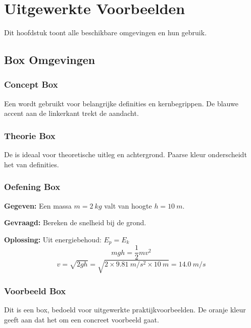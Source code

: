 
\chapter{Uitgewerkte Voorbeelden}
\label{ch:voorbeelden}

Dit hoofdstuk toont alle beschikbare omgevingen en hun gebruik.

\section{Box Omgevingen}

\subsection{Concept Box}
\begin{conceptbox}
Een  wordt gebruikt voor belangrijke definities en kernbegrippen.
De blauwe accent aan de linkerkant trekt de aandacht.
\end{conceptbox}

\subsection{Theorie Box}
\begin{theorieblok}
De  is ideaal voor theoretische uitleg en achtergrond.
Paarse kleur onderscheidt het van definities.
\end{theorieblok}

\subsection{Oefening Box}
\begin{oefenblok}[Oefening 3.1]
\textbf{Gegeven:} Een massa $m = \SI{2}{kg}$ valt van hoogte $h = \SI{10}{m}$.

\textbf{Gevraagd:} Bereken de snelheid bij de grond.

\textbf{Oplossing:}
Uit energiebehoud: $E_p = E_k$
\[ mgh = \frac{1}{2}mv^2 \]
\[ v = \sqrt{2gh} = \sqrt{2 \times \SI{9.81}{m/s^2} \times \SI{10}{m}} = \SI{14.0}{m/s} \]
\end{oefenblok}

\subsection{Voorbeeld Box}
\begin{voorbeeld}
Dit is een  box, bedoeld voor uitgewerkte praktijkvoorbeelden.
De oranje kleur geeft aan dat het om een concreet voorbeeld gaat.
\end{voorbeeld}

